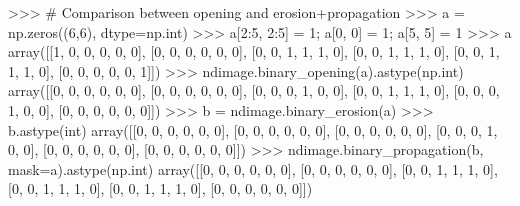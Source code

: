 \begin{DoxyVerb}
>>> # Comparison between opening and erosion+propagation
>>> a = np.zeros((6,6), dtype=np.int)
>>> a[2:5, 2:5] = 1; a[0, 0] = 1; a[5, 5] = 1
>>> a
array([[1, 0, 0, 0, 0, 0],
       [0, 0, 0, 0, 0, 0],
       [0, 0, 1, 1, 1, 0],
       [0, 0, 1, 1, 1, 0],
       [0, 0, 1, 1, 1, 0],
       [0, 0, 0, 0, 0, 1]])
>>> ndimage.binary_opening(a).astype(np.int)
array([[0, 0, 0, 0, 0, 0],
       [0, 0, 0, 0, 0, 0],
       [0, 0, 0, 1, 0, 0],
       [0, 0, 1, 1, 1, 0],
       [0, 0, 0, 1, 0, 0],
       [0, 0, 0, 0, 0, 0]])
>>> b = ndimage.binary_erosion(a)
>>> b.astype(int)
array([[0, 0, 0, 0, 0, 0],
       [0, 0, 0, 0, 0, 0],
       [0, 0, 0, 0, 0, 0],
       [0, 0, 0, 1, 0, 0],
       [0, 0, 0, 0, 0, 0],
       [0, 0, 0, 0, 0, 0]])
>>> ndimage.binary_propagation(b, mask=a).astype(np.int)
array([[0, 0, 0, 0, 0, 0],
       [0, 0, 0, 0, 0, 0],
       [0, 0, 1, 1, 1, 0],
       [0, 0, 1, 1, 1, 0],
       [0, 0, 1, 1, 1, 0],
       [0, 0, 0, 0, 0, 0]])\end{DoxyVerb}
 \hypertarget{namespacescipy_1_1ndimage_1_1morphology_a56e8af16251eeec0f7b62be209932d39}{}
